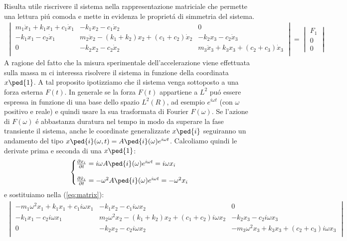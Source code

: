 \documentclass[12pt,a4paper]{article}
\makeatletter
\newenvironment{sistema}%
  {\left\lbrace\begin{array}{@{}l@{}}}%
  {\end{array}\right.}
\makeatother
\begin{document}
		Risulta utile riscrivere il sistema nella rappresentazione matriciale che permette una lettura pi\'u comoda e mette in evidenza le propriet\'a di simmetria del sistema.
		\begin {gather}
		\begin{vmatrix}
		m_1 \ddot{x}_1 + k_1x_1	+ c_1 \dot x_1	&  		- k_1 x_2	- c_1 \dot x_2 		&	0 \\
		- k_1 x_1 - c_2  \dot x_1 				&  	m_2 \ddot{x}_2	- (k_1 +k_2 )x_2 +(c_1 + c_2) \dot x_2	&	- k_2 x_3 - c_2\dot x_3 \\
		0	&  	-k_2 x_2 - c_2 \dot x_2		&m_3 \ddot{x}_3 + k_3 x_3 +(c_2 + c_3) \dot x_3	 \\
		\end{vmatrix}
		=
		\begin{vmatrix}
		F_1
		\\
		0
		\\
		0
		\label{eq:matrix}
		\end{vmatrix}
		\end{gather}
		A ragione del fatto che la misura sperimentale dell'accelerazione viene effettuata sulla massa m ci interessa risolvere il sistema in funzione della coordinata $x\ped{1}$. A tal proposito ipotizziamo che il sistema venga sottoposto a una forza esterna $F(t)$. In generale se la forza $F(t)$ appartiene a  $L^2$ pu\'o essere espressa in funzione di una base dello spazio $L^2(R)$, ad esempio $e^{i\omega t}$ (con $\omega$ positivo e reale) e quindi usare la sua trasformata di Fourier $F(\omega)$. Se l'azione di $F(\omega)$ \'e abbastanza duratura nel tempo in modo da superare la fase transiente il sistema, anche le coordinate generalizzate $x\ped{i} $ seguiranno un andamento del tipo $x\ped{i}(\omega, t)=A\ped{i}(\omega)e^{i\omega t}$. Calcoliamo quindi le derivate prima e seconda di una $x\ped{1}$:
		\begin {gather}
		\begin{sistema}
		\frac{\partial x_i}{\partial t }= i \omega A\ped{i}(\omega)e^{i\omega t}=i \omega x_i
		\\
		\\
		\frac{\partial \dot x_i}{\partial t }= - \omega ^2 A\ped{i}(\omega)e^{i\omega t}=-\omega^2 x_i
		\end{sistema}
		\end{gather}
		e sostituiamo nella (\ref{eq:matrix}):
		\begin {gather}
		\begin{vmatrix}
		-m_1 \omega^2 x_1 + k_1 x_1	+ c_1 i\omega x_1				&  	- k_1 x_2	- c_1 i\omega x_2 										&	0\\
		- k_1 x_1 - c_2  i\omega x_1 					&  	m_2 \omega^2 x_2	- (k_1 +k_2 )x_2 +(c_1 + c_2) i\omega x_2				&	- k_2 x_3 - c_2 i\omega x_3\\
		0													&  	-k_2 x_2 - c_2 i\omega x_2						&-m_3 \omega^2 x_3 + k_3 x_3 +(c_2 + c_3) i\omega x_3\\
		\label{eq:matrix2}
		\end{vmatrix}
		\end{gather}		
		
 
 
 
 
 
 
 
 
 
\end{document}
